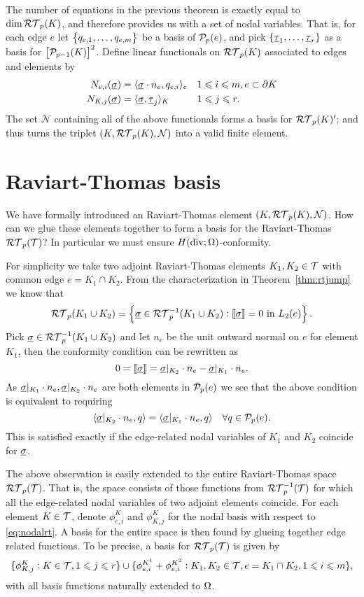 \documentclass[thesis.tex]{subfiles}
\begin{document}
The number of equations in the previous theorem is exactly equal to $\dim{\RT_p(K)}$, and therefore provides us with a
set of nodal variables. That is, for each edge $e$ let $\set{q_{e,1},\dots, q_{e,m}}$ be a basis of $\P_p(e)$, and pick
 $\set{\vtau_1, \dots, \vtau_r}$ as a  basis for $\left[\P_{p-1}(K)\right]^2$. 
 Define linear functionals on $\RT_p(K)$ associated to edges and elements by
\begin{equation}
  \label{eq:nodalrt}
  \begin{alignedat}{2}
    N_{e,i}(\vsig) &= \ip{\vsig \cdot n_e, q_{e,i}}_e && \quad 1 \leq i \leq m,  e \subset \partial K\\
    N_{K,j}(\vsig) &= \ip{\vsig, \vtau_j}_K &&\quad 1 \leq j \leq r.
  \end{alignedat}
\end{equation}
The set $\mathcal{N}$ containing all of the above functionals forms a basis for $\RT_p(K)'$; and thus
turns the triplet $(K, \RT_p(K), \mathcal{N})$ into a valid finite element.

\section{Raviart-Thomas basis}
We have formally introduced an Raviart-Thomas element $(K, \RT_p(K), \mathcal{N})$. How can we glue these elements
together to form a basis for the Raviart-Thomas $\RT_p(\T)$? In particular we must ensure $H(\div; \O)$-conformity.

For simplicity we take two adjoint Raviart-Thomas elements $K_1, K_2 \in  \T$ with common edge $e = K_1 \cap K_2$.
From the characterization in Theorem~\ref{thm:rtjump} we know that
\[
\RT_p(K_1 \cup K_2) = \set{\vsig \in \RT_p^{-1}(K_1 \cup K_2) : \llbracket \vsig \rrbracket = 0 \text{ in } L_2(e)}.
\]
Pick $\vsig \in \RT_p^{-1}(K_1 \cup K_2)$ and let $n_e$ be the unit outward normal on $e$ for element $K_1$,
then the conformity condition can be rewritten as
\[
  0 = \llbracket \vsig \rrbracket  = \vsig|_{K_2} \cdot  n_e - \vsig|_{K_1} \cdot n_e.
\]
As $\vsig|_{K_1} \cdot n_{e}, \vsig|_{K_2} \cdot n_{e}$ are both elements in $\P_p(e)$ we see that 
the  above condition is equivalent to requiring
\[
  \ip{\vsig|_{K_2} \cdot n_e, q} = \ip{\vsig|_{K_1} \cdot n_e, q} \quad \forall q \in \P_p(e).
\]
This is satisfied exactly if the edge-related nodal variables of $K_1$ and $K_2$ coincide for $\vsig$.

The above observation is easily extended to the entire Raviart-Thomas space $\RT_p( \T)$.
That is, the space consists of those functions from $\RT_p^{-1}( \T)$ for which all the edge-related
nodal variables of two adjoint elements coincide. For each element $K \in  \T$, denote $\phi^K_{e,i}$ and $\phi^K_{K,j}$
for the nodal basis with respect to \eqref{eq:nodalrt}. A basis for the entire space is then found by
glueing together edge related functions. To be precise, a basis for $\RT_p( \T)$ is given by
\begin{equation}
  \label{eq:basisrt}
  \{\phi^K_{K, j} : K \in  \T, 1 \leq j \leq r\} \cup \{\phi^{K^1}_{e,i} + \phi^{K^2}_{e,i}: K_1, K_2 \in  \T, e = K_1 \cap K_2, 1 \leq i \leq m\},
\end{equation}
with all basis functions naturally extended to $\O$.
\end{document}

